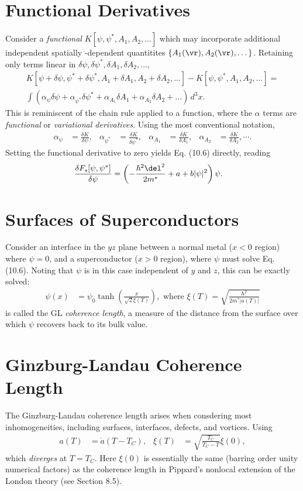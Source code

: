\documentclass[qo.tex]{subfiles}
\begin{document}
\section{Functional Derivatives}
Consider a \emph{functional} $K[\psi,\psi^*,A_1,A_2,\dots]$ which may incorporate additional independent spatially -dependent quantitites $\{A_1(\vr),A_2(\vr),\dots\}$.
Retaining only terms linear in $\delta\psi,\delta\psi^*,\delta A_1,\delta A_2,\dots$,
\begin{multline}
    K[\psi+\delta\psi,\psi^*+\delta\psi^*,A_1+\delta A_1,A_2+\delta A_2,\dots] - K[\psi,\psi^*,A_1,A_2,\dots] = \\ \int \left(\alpha_\psi\delta\psi + \alpha_{\psi^*}\delta\psi^* + \alpha_{A_1}\delta A_1 + \alpha_{A_2}\delta A_2 + \dots\right)\,d^3x.
\end{multline}
This is reminiscent of the chain rule applied to a function, where the $\alpha$ terms are \emph{functional} or \emph{variational derivatives}.
Using the most conventional notation, 
\begin{align}
    \alpha_\psi &= \frac{\delta K}{\delta\psi}, & \alpha_{\psi^*} &= \frac{\delta K}{\delta\psi^*}, & \alpha_{A_1} &= \frac{\delta K}{\delta A_1}, & \alpha_{A_2} &= \frac{\delta K}{\delta A_2},\cdots.
\end{align}
Setting the functional derivative to zero yields Eq. (10.6) directly, reading
\begin{align}
    \frac{\delta F_s[\psi,\psi^*]}{\delta\psi} &= \left(-\frac{\hbar^2\del^2}{2m^*}+a+b|\psi|^2\right)\psi.
\end{align}

\section{Surfaces of Superconductors}
Consider an interface in the $yz$ plane between a normal metal ($x<0$ region) where $\psi=0$, and a superconductor ($x>0$ region), where $\psi$ must solve Eq. (10.6).
Noting that $\psi$ is in this case independent of $y$ and $z$, this can be exactly solved:
\begin{align}
    \psi(x) &= \psi_0\tanh\left(\frac{x}{\sqrt{2}\xi(T)}\right), \text{ where } \xi(T) = \sqrt{\frac{\hbar^2}{2m^*|a(T)|}}
\end{align}
is called the GL \emph{coherence length}, a measure of the distance from the surface over which $\psi$ recovers back to its bulk value. 

\section{Ginzburg-Landau Coherence Length}
The Ginzburg-Landau coherence length arises when consdering most inhomogeneities, including surfaces, interfaces, defects, and vortices. 
Using 
\begin{align}
    a(T) &= \dot{a}(T-T_C), & \xi(T) &= \sqrt{\frac{T_C}{T_C-T}}\xi(0),
\end{align}
which \emph{diverges} at $T=T_C$.
Here $\xi(0)$ is essentially the same (barring order unity numerical factors) as the coherence length in Pippard's nonlocal extension of the London theory (see Section 8.5).
\end{document}
